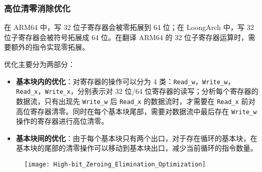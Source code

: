 

\subsubsection{高位清零消除优化}
在 ARM64 中，写 32 位子寄存器会被零拓展到 64 位；在 LoongArch 中，写 32 位子寄存器会被符号拓展成 64 位。在翻译 ARM64 的 32 位子寄存器运算时，需要额外的指令实现零拓展。

优化主要分为两部分：
\begin{itemize}
    \item \textbf{基本块内的优化}：对寄存器的操作可以分为 4 类：\texttt{Read\_w}，\texttt{Write\_w}，\texttt{Read\_x}，\texttt{Write\_x}，分别表示对 32 位/64 位寄存器的读写；分析每个寄存器的数据流，只有出现先 \texttt{Write\_w} 后 \texttt{Read\_x} 的数据流时，才需要在 \texttt{Read\_x} 前对高位寄存器清零。同时在每个基本块尾部，需要对数据流中最后存在 \texttt{Write\_w} 操作的寄存器进行高位清零。
    \item \textbf{基本块间的优化}：由于每个基本块只有两个出口，对于存在循环的基本块，在基本块的尾部的清零操作可以移动到基本块出口，减少当前循环的指令数量。
\end{itemize}

\begin{figure}[!htbp]
    \centering
    \texttt{[image: High-bit\_Zeroing\_Elimination\_Optimization]}
    \label{fig:High-bit_Zeroing_Elimination_Optimization}
\end{figure}

